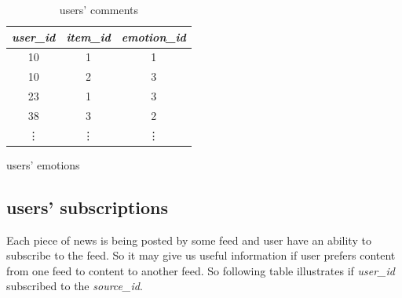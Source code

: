 \documentclass{article}
\begin{document}
\begin{table}[h]
    \parbox{.45\textwidth}{
        \centering
        \begin{tabular}{ccc}
            \toprule

            \emph{user\_id} & \emph{item\_id} & \emph{emotion\_id} \\\midrule
            10 & 1 & 1  \\
            10 & 2 & 3        \\
            23 & 1 & 3        \\
            38 & 3 & 2        \\
            \vdots & \vdots & \vdots  \\\bottomrule

        \end{tabular}
        \caption{users' emotions}
        \label{tab:emotion}
    }
    \hfill
    \parbox{.45\textwidth}{
        \centering
        \caption{users' comments}
        \label{tab:comment}
        }
\end{table}   





\subsection*{users' subscriptions}

Each piece of news is being posted by some feed and user have an ability to subscribe to the feed. So it may give us useful information if user prefers content from one feed to content to another feed. So following table illustrates if \emph{user\_id} subscribed to the \emph{source\_id}.
\end{document}
